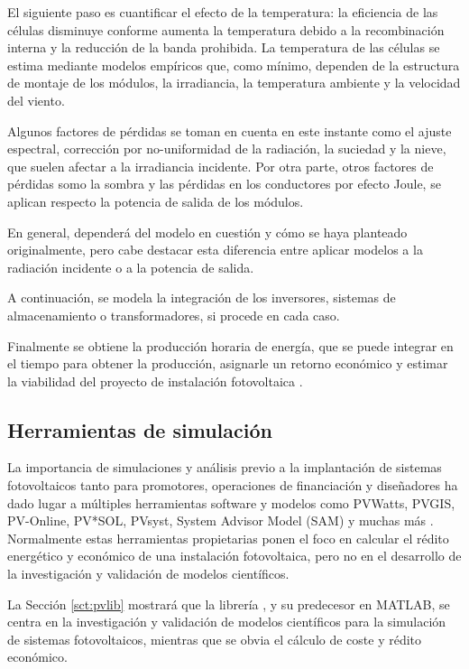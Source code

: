 El siguiente paso es cuantificar el efecto de la temperatura: la eficiencia de las células disminuye conforme aumenta la temperatura debido a la \gls{recombinación interna} y la reducción de la \gls{banda prohibida}. La temperatura de las células se estima mediante modelos empíricos que, como mínimo, dependen de la estructura de montaje de los \glspl{módulo}, la irradiancia, la temperatura ambiente y la velocidad del viento.

Algunos factores de pérdidas se toman en cuenta en este instante como el \gls{ajuste espectral}, corrección por no-uniformidad de la radiación, la suciedad y la nieve, que suelen afectar a la irradiancia incidente. Por otra parte, otros factores de pérdidas somo la \gls{sombra} y las pérdidas en los conductores por \gls{efecto Joule}, se aplican respecto la potencia de salida de los módulos.

En general, dependerá del modelo en cuestión y cómo se haya planteado originalmente, pero cabe destacar esta diferencia entre aplicar modelos a la radiación incidente o a la potencia de salida.

A continuación, se modela la integración de los \gls{inversores}, \gls{sistemas de almacenamiento} o \gls{transformadores}, si procede en cada caso.

Finalmente se obtiene la producción horaria de energía, que se puede integrar en el tiempo para obtener la producción, asignarle un retorno económico y estimar la viabilidad del proyecto de instalación fotovoltaica \cite{Rosa-Clot_Tina_2020}.

\subsection{Herramientas de simulación}

La importancia de simulaciones y análisis previo a la implantación de sistemas fotovoltaicos tanto para promotores, operaciones de financiación y diseñadores ha dado lugar a múltiples herramientas \gls{software} y modelos como PVWatts, PVGIS, PV-Online, PV*SOL, PVsyst, System Advisor Model (SAM) y muchas más \cite{stein_models_2009, Kumar_2017}. Normalmente estas herramientas propietarias ponen el foco en calcular el rédito energético y económico de una instalación fotovoltaica, pero no en el desarrollo de la investigación y validación de modelos científicos.

La Sección \ref{sct:pvlib} mostrará que la librería \pvlibpy{}, y su predecesor en \gls{MATLAB}, se centra en la investigación y validación de modelos científicos para la simulación de sistemas fotovoltaicos, mientras que se obvia el cálculo de coste y rédito económico.
